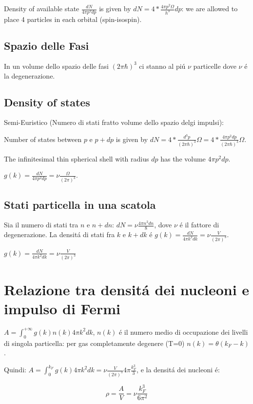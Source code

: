 \documentclass[main.tex]{subfiles}
\begin{document}
Density of available state $\frac{dN}{4\pi p^2dp}$ is given by $dN=4*\frac{4\pi p^2\Omega}{h^3}dp$: we are allowed to place 4 particles in each orbital (spin-isospin).

\subsection{Spazio delle Fasi}
In un volume dello spazio delle fasi $(2\pi\hbar)^3$ ci stanno al pi\'u $\nu$ particelle dove $\nu$ \'e la degenerazione.

\subsection{Density of states}
Semi-Euristico (Numero di stati fratto volume dello spazio delgi impulsi):

Number of states between $p$ e $p+dp$ is given by $dN=4*\frac{d^3p}{(2\pi\hbar)^3}\Omega=4*\frac{4\pi p^2dp}{(2\pi\hbar)^3}\Omega$.

The infinitesimal thin spherical shell with radius $dp$ has the volume $4\pi p^2dp$.

$g(k)=\frac{dN}{4\pi p^2dp}=\nu\frac{\Omega}{(2\pi)^3}$.

\subsection{Stati particella in una scatola}
Sia il numero di stati tra $n$ e $n+dn$: $dN=\nu \frac{4\pi n^2dn}{8}$, dove $\nu$ \'e il fattore di degenerazione. La densit\'a di stati fra $k$ e $k+dk$ \'e $g(k)=\frac{dN}{4\pi k^2dk}=\nu \frac{V}{(2\pi)^3}$.

$g(k)=\frac{dN}{4\pi k^2dk}=\nu \frac{V}{(2\pi)^3}$

\section{Relazione tra densit\'a dei nucleoni e impulso di Fermi}
$A=\int_0^{+\infty}g(k)n(k)4\pi k^2dk$, $n(k)$ \'e il numero medio di occupazione dei livelli di singola particella: per gas completamente degenere (T=0)    
 $n(k)=\theta (k_F-k)$. 
 
Quindi: $A=\int_0^{k_F}g(k)4\pi k^2dk=\nu \frac{V}{(2\pi)^3}4\pi \frac{k_F^3}{3}$, e la densit\'a dei nucleoni \'e:
 
 \begin{equation*}
 \rho =\frac{A}{V}=\nu \frac{k_F^3}{6\pi^2}
 \end{equation*}
\end{document}

